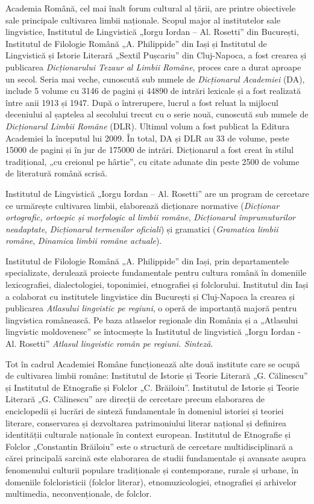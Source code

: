 \begin{multicols}{2}
Academia Română, cel mai înalt forum cultural al țării, are printre obiectivele sale principale cultivarea limbii naționale. Scopul major al institutelor sale lingvistice, Institutul de Lingvistică „Iorgu Iordan -- Al. Rosetti” din București, Institutul de Filologie Română „A. Philippide” din Iași și Institutul de Lingvistică și Istorie Literară „Sextil Pușcariu” din Cluj-Napoca, a fost crearea și publicarea \textit{Dicționarului Tezaur al Limbii Române}, proces care a durat aproape un secol. Seria mai veche, cunoscută sub numele de \textit{Dicționarul Academiei} (DA), include 5 volume cu 3146 de pagini și 44890 de intrări lexicale și a fost realizată între anii 1913 și 1947. După o întrerupere, lucrul a fost reluat la mijlocul deceniului al șaptelea al secolului trecut cu o serie nouă, cunoscută sub numele de \textit{Dicționarul Limbii Române} (DLR). Ultimul volum a fost publicat la Editura Academiei la începutul lui 2009. În total, DA și DLR au 33 de volume, peste 15000 de pagini și în jur de 175000 de intrări. Dicționarul a fost creat în stilul tradițional, „cu creionul pe hârtie”, cu citate adunate din peste 2500 de volume de literatură română scrisă.

Institutul de Lingvistică „Iorgu Iordan -- Al. Rosetti” are un program de cercetare ce urmărește cultivarea limbii, elaborează dicționare normative (\textit{Dicționar ortografic, ortoepic și morfologic al limbii române}, \textit{Dicționarul împrumuturilor neadaptate}, \textit{Dicționarul termenilor oficiali}) și gramatici (\textit{Gramatica limbii române}, \textit{Dinamica limbii române actuale}).

Institutul de Filologie Română „A. Philippide” din Iași, prin departamentele specializate, derulează proiecte fundamentale pentru cultura română în domeniile lexicografiei, dialectologiei, toponimiei, etnografiei și folclorului. Institutul din Iași a colaborat cu institutele lingvistice din București și Cluj-Napoca la crearea și publicarea \textit{Atlasului lingvistic pe regiuni}, o operă de importanță majoră pentru lingvistica românească. Pe baza atlaselor regionale din România și a „Atlasului lingvistic moldovenesc” se întocmește la Institutul de lingvistică „Iorgu Iordan - Al. Rosetti” \textit{Atlasul lingvistic român pe regiuni. Sinteză}. 

Tot în cadrul Academiei Române funcționează alte două institute care se ocupă de cultivarea limbii române: Institutul de Istorie și Teorie Literară „G. Călinescu” și Institutul de Etnografie și Folclor „C. Brăiloiu”. Institutul de Istorie și Teorie Literară „G. Călinescu” are direcții de cercetare precum elaborarea de enciclopedii și lucrări de sinteză fundamentale în domeniul istoriei și teoriei literare, conservarea și dezvoltarea patrimoniului literar național și definirea identității culturale naționale în context european. Institutul de Etnografie și Folclor „Constantin Brăiloiu” este o structură de cercetare multidisciplinară a cărei principală sarcină este elaborarea de studii fundamentale și avansate asupra fenomenului culturii populare tradiționale și contemporane, rurale și urbane, în domeniile folcloristicii (folclor literar), etnomuzicologiei, etnografiei și arhivelor multimedia, neconvenționale, de folclor.


\end{multicols}

